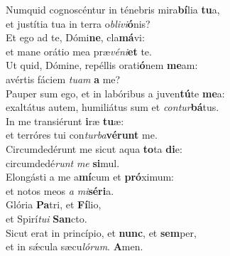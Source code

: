 \oddverse Numquid cognoscéntur in ténebris mira\textbf{bí}lia \textbf{tu}a,~\*\\
\oddverse et justítia tua in terra o\textit{bli}\textit{vi}\textbf{ó}nis?\\
\evenverse Et ego ad te, Dómi\textbf{ne}, cla\textbf{má}vi:~\*\\
\evenverse et mane orátio mea præ\textit{vé}\textit{ni}\textbf{et} te.\\
\oddverse Ut quid, Dómine, repéllis orati\textbf{ó}nem \textbf{me}am:~\*\\
\oddverse avértis fáciem \textit{tu}\textit{am} \textbf{a} me?\\
\evenverse Pauper sum ego, et in labóribus a juven\textbf{tú}te \textbf{me}a:~\*\\
\evenverse exaltátus autem, humiliátus sum et \textit{con}\textit{tur}\textbf{bá}tus.\\
\oddverse In me transiérunt \textbf{i}ræ \textbf{tu}æ:~\*\\
\oddverse et terróres tui con\textit{tur}\textit{ba}\textbf{vé}\textbf{runt} me.\\
\evenverse Circumdedérunt me sicut aqua \textbf{to}ta \textbf{di}e:~\*\\
\evenverse circumdedé\textit{runt} \textit{me} \textbf{si}mul.\\
\oddverse Elongásti a me a\textbf{mí}cum et \textbf{pró}ximum:~\*\\
\oddverse et notos meos \textit{a} \textit{mi}\textbf{sé}\textbf{ri}a.\\
\evenverse Glória \textbf{Pa}tri, et \textbf{Fí}lio,~\*\\
\evenverse et Spirí\textit{tu}\textit{i} \textbf{San}cto.\\
\oddverse Sicut erat in princípio, et \textbf{nunc}, et \textbf{sem}per,~\*\\
\oddverse et in sǽcula sæcu\textit{ló}\textit{rum}. \textbf{A}men.\\
